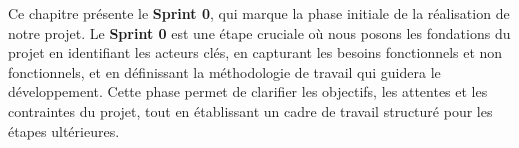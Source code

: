 Ce chapitre présente le \textbf{Sprint 0}, 
qui marque la phase initiale de la réalisation de notre projet.
Le \textbf{Sprint 0} est une étape cruciale où nous posons les fondations du projet en identifiant les acteurs clés, 
en capturant les besoins fonctionnels et non fonctionnels,
et en définissant la méthodologie de travail qui guidera le développement. Cette phase permet de clarifier les objectifs,
les attentes et les contraintes du projet, 
tout en établissant un cadre de travail structuré pour les étapes ultérieures.
